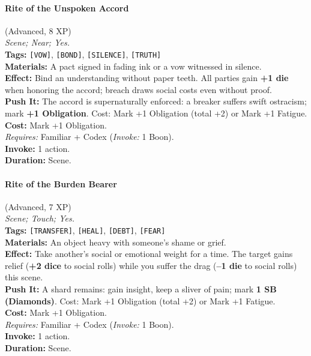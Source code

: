 \paragraph{Rite of the Unspoken Accord} (Advanced, 8 XP) \hfill \\
\emph{Scene; Near; Yes.} \\
\textbf{Tags:} \texttt{[VOW]}, \texttt{[BOND]}, \texttt{[SILENCE]}, \texttt{[TRUTH]} \\
\textbf{Materials:} A pact signed in fading ink or a vow witnessed in silence. \\
\textbf{Effect:} Bind an understanding without paper teeth. All parties gain \textbf{+1 die} when honoring the accord; breach draws social costs even without proof. \\
\textbf{Push It:} The accord is supernaturally enforced: a breaker suffers swift ostracism; mark \textbf{+1 Obligation}. Cost: Mark +1 Obligation (total +2) or Mark +1 Fatigue. \\
\textbf{Cost:} Mark +1 Obligation. \\
\textit{Requires:} Familiar + Codex (\textit{Invoke:} 1 Boon). \\
\textbf{Invoke:} 1 action. \\
\textbf{Duration:} Scene.

\paragraph{Rite of the Burden Bearer} (Advanced, 7 XP) \hfill \\
\emph{Scene; Touch; Yes.} \\
\textbf{Tags:} \texttt{[TRANSFER]}, \texttt{[HEAL]}, \texttt{[DEBT]}, \texttt{[FEAR]} \\
\textbf{Materials:} An object heavy with someone's shame or grief. \\
\textbf{Effect:} Take another's social or emotional weight for a time. The target gains relief (\textbf{+2 dice} to social rolls) while you suffer the drag (\textbf{--1 die} to social rolls) this scene. \\
\textbf{Push It:} A shard remains: gain insight, keep a sliver of pain; mark \textbf{1 SB (Diamonds)}. Cost: Mark +1 Obligation (total +2) or Mark +1 Fatigue. \\
\textbf{Cost:} Mark +1 Obligation. \\
\textit{Requires:} Familiar + Codex (\textit{Invoke:} 1 Boon). \\
\textbf{Invoke:} 1 action. \\
\textbf{Duration:} Scene.

